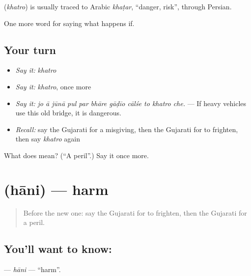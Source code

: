 \begin{cousinweb}
\textbf{} (\emph{khatro}) is usually traced to Arabic \emph{khaṭar}, \textquotedblleft{}danger, risk\textquotedblright{}, through Persian.
\end{cousinweb}

\begin{grammarlens}[title={What you've built}]
One more word for saying what happens if.
\end{grammarlens}

\subsection*{Your turn}
\begin{itemize}
\raggedright
  \item \emph{Say it:} \emph{khatro}
  \item \emph{Say it:} \emph{khatro}, once more
  \item \emph{Say it:} \emph{jo ā jūnā pul par bhāre gāḍīo cālśe to khatro che.} — If heavy vehicles use this old bridge, it is dangerous.
  \item \emph{Recall:} say the Gujarati for a misgiving, then the Gujarati for to frighten, then say \emph{khatro} again
\end{itemize}

\begin{tcolorbox}[breakable,colback=teal!4,colframe=teal!35!black,title={Before you move on}]
What does  mean? (\textquotedblleft{}A peril\textquotedblright{}.) Say it once more.
\end{tcolorbox}
\section[\texorpdfstring{\gu{હાનિ} (hāni)}{હાનિ (hāni)}]{ (hāni) — harm}

\label{lesson:GU-C370-hani}



\begin{quote}
Before the new one: say the Gujarati for to frighten, then the Gujarati for a peril.
\end{quote}

\subsection*{You'll want to know: }
\textbf{} — \emph{hāni} — \textquotedblleft{}harm\textquotedblright{}.


